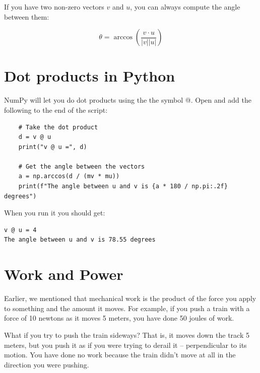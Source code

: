 If you have two non-zero vectors $v$ and $u$, you can always compute the angle between them:

$$\theta = \arccos(\frac{v \cdot u}{|v| |u|})$$
\section{Dot products in Python}

NumPy will let you do dot products using the the symbol @.  Open  
and add the following to the end of the script:

\begin{Verbatim}
    # Take the dot product
    d = v @ u
    print("v @ u =", d)
    
    # Get the angle between the vectors
    a = np.arccos(d / (mv * mu))
    print(f"The angle between u and v is {a * 180 / np.pi:.2f} degrees")    
\end{Verbatim}

When you run it you should get:
\begin{Verbatim}
v @ u = 4
The angle between u and v is 78.55 degrees
\end{Verbatim}

\section{Work and Power}
Earlier, we mentioned that mechanical work is the product of the 
force you apply to something and the amount it moves. For example, if you 
push a train with a force of 10 newtons as it moves 5 meters, you have done 50 joules of work.

What if you try to push the train sideways? That is, it moves down the track 5 meters, 
but you push it as if you were trying to derail it -- perpendicular to its motion.  
You have done no work because the train didn't move at all in the direction you were pushing.

